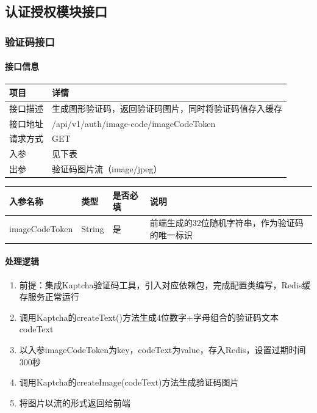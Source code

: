 \documentclass[12pt, a4paper]{article}
\begin{document}
\subsection{认证授权模块接口}

\subsubsection{验证码接口}



\begin{table}[H]
    \paragraph{接口信息}
    \centering
    \begin{tabular}{|l|l|}
        \hline
        项目 & 详情 \\
        \hline
        接口描述 & 生成图形验证码，返回验证码图片，同时将验证码值存入缓存 \\
        \hline
        接口地址 & /api/v1/auth/image-code/{imageCodeToken} \\
        \hline
        请求方式 & GET \\
        \hline
        入参 & 见下表 \\
        \hline
        出参 & 验证码图片流（image/jpeg） \\
        \hline
    \end{tabular}
\end{table}

\begin{table}[H]
    \centering
    \begin{tabular}{|l|l|l|l|}
        \hline
        入参名称 & 类型 & 是否必填 & 说明 \\
        \hline
        imageCodeToken & String & 是 & 前端生成的32位随机字符串，作为验证码的唯一标识 \\
        \hline
    \end{tabular}
\end{table}

\paragraph{处理逻辑}
\begin{enumerate}
\item 前提：集成Kaptcha验证码工具，引入对应依赖包，完成配置类编写，Redis缓存服务正常运行

\item 调用Kaptcha的createText()方法生成4位数字+字母组合的验证码文本codeText

\item 以入参imageCodeToken为key，codeText为value，存入Redis，设置过期时间300秒

\item 调用Kaptcha的createImage(codeText)方法生成验证码图片

\item 将图片以流的形式返回给前端
\end{enumerate}
\end{document}
